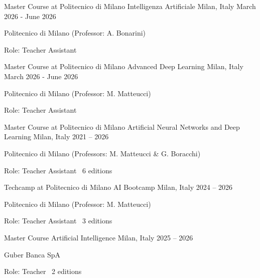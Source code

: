 
\begin{cventries}

    \vspace{2mm}
    \cventry
        {Master Course at Politecnico di Milano}
        {Intelligenza Artificiale}
        {Milan, Italy}
        {March 2026 - June 2026}
        {
        \begin{cvitems}
            \item {Politecnico di Milano (Professor: A. Bonarini)}
            \item {Role: Teacher Assistant}
        \end{cvitems}
        }

    \vspace{2mm}
    \cventry
        {Master Course at Politecnico di Milano}
        {Advanced Deep Learning}
        {Milan, Italy}
        {March 2026 - June 2026}
        {
        \begin{cvitems}
            \item {Politecnico di Milano (Professor: M. Matteucci)}
            \item {Role: Teacher Assistant}
        \end{cvitems}
        }

    \vspace{2mm}
    \cventry
        {Master Course at Politecnico di Milano}
        {Artificial Neural Networks and Deep Learning}
        {Milan, Italy}
        {2021 -- 2026}
        {
        \begin{cvitems}
            \item {Politecnico di Milano (Professors: M. Matteucci \& G. Boracchi)}
            \item {Role: Teacher Assistant \textperiodcentered\ 6 editions}
        \end{cvitems}
        }

    \vspace{2mm}
    \cventry
        {Techcamp at Politecnico di Milano}
        {AI Bootcamp}
        {Milan, Italy}
        {2024 -- 2026}
        {
        \begin{cvitems}
            \item {Politecnico di Milano (Professor: M. Matteucci)}
            \item {Role: Teacher Assistant \textperiodcentered\ 3 editions}
        \end{cvitems}
        }

    \vspace{2mm}
    \cventry
        {Master Course}
        {Artificial Intelligence}
        {Milan, Italy}
        {2025 -- 2026}
        {
        \begin{cvitems}
            \item {Guber Banca SpA}
            \item {Role: Teacher \textperiodcentered\ 2 editions}
        \end{cvitems}
        }


\end{cventries}

